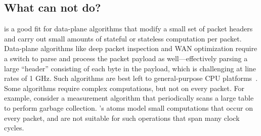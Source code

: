\subsection{What can \absmachine not do?}
\label{ss:limitations}

\absmachine is a good fit for data-plane algorithms that modify a small set of
packet headers and carry out small amounts of stateful or stateless computation
per packet. Data-plane algorithms like deep packet inspection and WAN
optimization require a switch to parse and process the packet payload as
well---effectively parsing a large ``header'' consisting of each byte in the
payload, which is challenging at line rates of 1 GHz. Such algorithms are best
left to general-purpose CPU platforms~\cite{e2}.  Some algorithms require
complex computations, but not on every packet.  For example, consider a
measurement algorithm that periodically scans a large table to perform garbage
collection.  \absmachine's atoms model small computations that occur on every
packet, and are not suitable for such operations that span many clock cycles.
